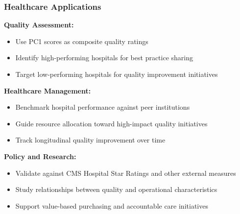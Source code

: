 \documentclass[aspectratio=169]{beamer}
\begin{document}
\begin{frame}
    \frametitle{Healthcare Applications}
    \textbf{Quality Assessment:}
    \begin{itemize}
        \item Use PC1 scores as composite quality ratings \pause
        \item Identify high-performing hospitals for best practice sharing \pause
        \item Target low-performing hospitals for quality improvement initiatives \pause
    \end{itemize}
    \vspace{6pt}
    \textbf{Healthcare Management:}
    \begin{itemize}
        \item Benchmark hospital performance against peer institutions \pause
        \item Guide resource allocation toward high-impact quality initiatives \pause
        \item Track longitudinal quality improvement over time \pause
    \end{itemize}
    \vspace{6pt}
    \textbf{Policy and Research:}
    \begin{itemize}
        \item Validate against CMS Hospital Star Ratings and other external measures \pause
        \item Study relationships between quality and operational characteristics \pause
        \item Support value-based purchasing and accountable care initiatives \pause
    \end{itemize}
\end{frame}
\end{document}
